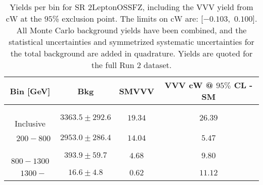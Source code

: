\begin{table}[!htbp]
    \small
    \center
    \begin{tabular}{c||c|c|c}
    Bin [GeV] & Bkg & SMVVV & \pbox{20cm}{VVV \\ cW @ $95\%$ CL - SM \\ }\\
    \hline
    \pbox{20cm}{ ~ \\Inclusive\\ } & $3363.5 \pm 292.6$ & $19.34$ & $26.39$\\
    \hline
    \pbox{20cm}{ ~ \\$200-800$\\ } & $2953.0 \pm 286.4$ & $14.04$ & $5.47$\\
    \hline
    \pbox{20cm}{ ~ \\$800-1300$\\ } & $393.9 \pm 59.7$ & $4.68$ & $9.80$\\
    \hline
    \pbox{20cm}{ ~ \\$1300-$\\ } & $16.6 \pm 4.8$ & $0.62$ & $11.12$\\
\end{tabular}
    \caption{Yields per bin for SR 2LeptonOSSFZ, including the VVV yield from cW at the $95$\% exclusion point. The limits on cW are: [$-0.103$,~$0.100$]. All Monte Carlo background yields have been combined, and the statistical uncertainties and symmetrized systematic uncertainties for the total background are added in quadrature. Yields are quoted for the full Run 2 dataset.}
    \label{tab:2LeptonOSSFZ$binssignal}
\end{table}
